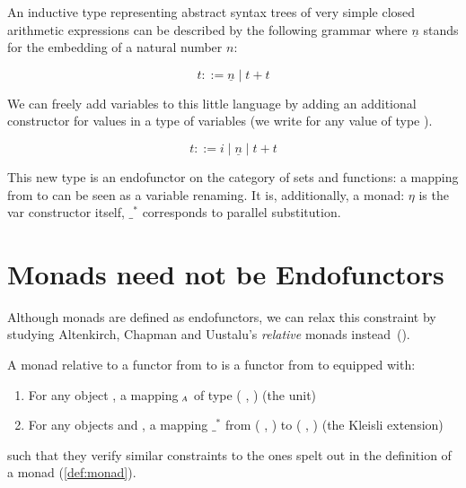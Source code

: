 \begin{example}
\label{example:arithsetexample}
An inductive type representing abstract syntax trees of very simple closed
arithmetic expressions can be described by the following grammar where
$\underline{n}$ stands for the embedding of a natural number $n$:

$$t ::= \underline{n} \mid t + t$$

We can freely add variables to this little language by adding an additional
constructor for values in a type of variables  (we write  for any
value of type ).

$$t ::= i \mid \underline{n} \mid t + t$$

This new type is an endofunctor on the category of sets and functions: a
mapping from { to } can be seen as a variable renaming. It is,
additionally, a monad: $η$ is the var constructor itself, $\_^*$ corresponds
to parallel substitution.

\end{example}

\section{Monads need not be Endofunctors}\label{sec:relativemonad}

Although monads are defined as endofunctors, we can relax this
constraint by studying Altenkirch, Chapman and Uustalu's
\emph{relative} monads instead~(\citeyear{Altenkirch2010,JFR4389}).

\begin{definition}
\label{def:relative-monad}
A monad relative to a functor  from  to 
is a functor  from  to  equipped with:
\begin{enumerate}
  \item For any object , a mapping $_{\AB{A}}$ of type
    {( ,  )} (the unit)
  \item For any objects  and , a mapping $\_^*$
    from {( ,  )}
    to {( ,  )} (the Kleisli extension)
\end{enumerate}

such that they verify similar constraints to the ones spelt out in the
definition of a monad (\ref{def:monad}).
\end{definition}


